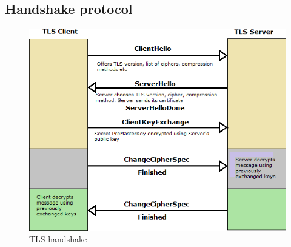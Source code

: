 \subsection{Handshake protocol}


\begin{figure}
  \includegraphics[width=\textwidth]{images/tls-handshake.png}
  \caption{TLS handshake}
\end{figure}
